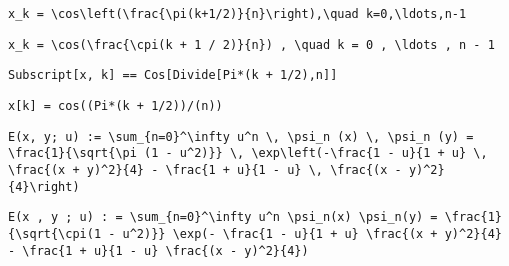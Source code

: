 \newsavebox\AMT
\begin{lrbox}{\AMT}
 \begin{minipage}[t]{0.82\textwidth}
  \lstinline[language={[latex]TeX},mathescape,breaklines=true]"x_k = \cos\left(\frac{\pi(k+1/2)}{n}\right),\quad k=0,\ldots,n-1"
 \end{minipage}
\end{lrbox}
\newsavebox\AMST
\begin{lrbox}{\AMST}
 \begin{minipage}[t]{0.82\textwidth}
  \lstinline[language={[latex]TeX},mathescape,breaklines=true]"x_k = \cos(\frac{\cpi(k + 1 / 2)}{n}) , \quad k = 0 , \ldots , n - 1"
 \end{minipage}
\end{lrbox}
\newsavebox\AMMM
\begin{lrbox}{\AMMM}
 \begin{minipage}[t]{0.82\textwidth}
  \lstinline[language={[latex]TeX},mathescape,breaklines=true]"Subscript[x, k] == Cos[Divide[Pi*(k + 1/2),n]]"
 \end{minipage}
\end{lrbox}
\newsavebox\AMMA
\begin{lrbox}{\AMMA}
 \begin{minipage}[t]{0.82\textwidth}
  \lstinline[language={[latex]TeX},mathescape,breaklines=true]"x[k] = cos((Pi*(k + 1/2))/(n))"
 \end{minipage}
\end{lrbox}
\newsavebox\ANT
\begin{lrbox}{\ANT}
 \begin{minipage}[t]{0.82\textwidth}
  \lstinline[language={[latex]TeX},mathescape,breaklines=true]"E(x, y; u) := \sum_{n=0}^\infty u^n \, \psi_n (x) \, \psi_n (y) = \frac{1}{\sqrt{\pi (1 - u^2)}} \, \exp\left(-\frac{1 - u}{1 + u} \, \frac{(x + y)^2}{4} - \frac{1 + u}{1 - u} \, \frac{(x - y)^2}{4}\right)"
 \end{minipage}
\end{lrbox}
\newsavebox\ANST
\begin{lrbox}{\ANST}
 \begin{minipage}[t]{0.82\textwidth}
  \lstinline[language={[latex]TeX},mathescape,breaklines=true]"E(x , y ; u) : = \sum_{n=0}^\infty u^n \psi_n(x) \psi_n(y) = \frac{1}{\sqrt{\cpi(1 - u^2)}} \exp(- \frac{1 - u}{1 + u} \frac{(x + y)^2}{4} - \frac{1 + u}{1 - u} \frac{(x - y)^2}{4})"
 \end{minipage}
\end{lrbox}
